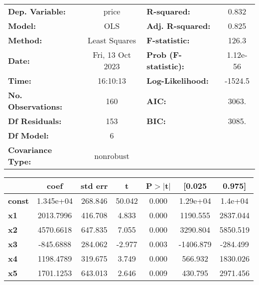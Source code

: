 \begin{center}
\begin{tabular}{lclc}
\toprule
\textbf{Dep. Variable:}    &      price       & \textbf{  R-squared:         } &     0.832   \\
\textbf{Model:}            &       OLS        & \textbf{  Adj. R-squared:    } &     0.825   \\
\textbf{Method:}           &  Least Squares   & \textbf{  F-statistic:       } &     126.3   \\
\textbf{Date:}             & Fri, 13 Oct 2023 & \textbf{  Prob (F-statistic):} &  1.12e-56   \\
\textbf{Time:}             &     16:10:13     & \textbf{  Log-Likelihood:    } &   -1524.5   \\
\textbf{No. Observations:} &         160      & \textbf{  AIC:               } &     3063.   \\
\textbf{Df Residuals:}     &         153      & \textbf{  BIC:               } &     3085.   \\
\textbf{Df Model:}         &           6      & \textbf{                     } &             \\
\textbf{Covariance Type:}  &    nonrobust     & \textbf{                     } &             \\
\bottomrule
\end{tabular}
\begin{tabular}{lcccccc}
               & \textbf{coef} & \textbf{std err} & \textbf{t} & \textbf{P$> |$t$|$} & \textbf{[0.025} & \textbf{0.975]}  \\
\midrule
\textbf{const} &    1.345e+04  &      268.846     &    50.042  &         0.000        &     1.29e+04    &      1.4e+04     \\
\textbf{x1}    &    2013.7996  &      416.708     &     4.833  &         0.000        &     1190.555    &     2837.044     \\
\textbf{x2}    &    4570.6618  &      647.835     &     7.055  &         0.000        &     3290.804    &     5850.519     \\
\textbf{x3}    &    -845.6888  &      284.062     &    -2.977  &         0.003        &    -1406.879    &     -284.499     \\
\textbf{x4}    &    1198.4789  &      319.675     &     3.749  &         0.000        &      566.932    &     1830.026     \\
\textbf{x5}    &    1701.1253  &      643.013     &     2.646  &         0.009        &      430.795    &     2971.456     \\

\end{tabular}
\end{center}
